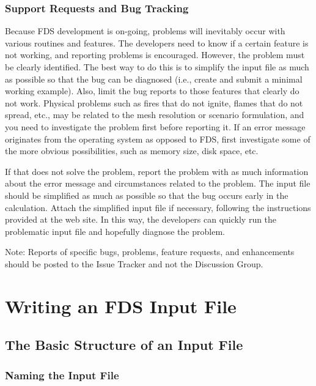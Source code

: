 \documentclass[11pt]{book}
\begin{document}
\section{Support Requests and Bug Tracking}

Because FDS development is on-going, problems will inevitably occur with various routines and features. The developers need to know if a certain feature is not working, and reporting problems is encouraged. However, the problem must be clearly identified. The best way to do this is to simplify the input file as much as possible so that the bug can be diagnosed (i.e., create and submit a minimal working example). Also, limit the bug reports to those features that clearly do not work. Physical problems such as fires that do not ignite, flames that do not spread, etc., may be related to the mesh resolution or scenario formulation, and you need to investigate the problem first before reporting it. If an error message originates from the operating system as opposed to FDS, first investigate some of the more obvious possibilities, such as memory size, disk space, etc.

If that does not solve the problem, report the problem with as much information about the error message and circumstances related to the problem. The input file should be simplified as much as possible so that the bug occurs early in the calculation. Attach the simplified input file if necessary, following the instructions provided at the web site. In this way, the developers can quickly run the problematic input file and hopefully diagnose the problem.

Note: Reports of specific bugs, problems, feature requests, and enhancements should be posted to the Issue Tracker and not the Discussion Group.






\part{Writing an FDS Input File}
\label{info:inputfilecreation}



\chapter{The Basic Structure of an Input File}
\label{info:fdsBasic}


\section{Naming the Input File}
\end{document}
